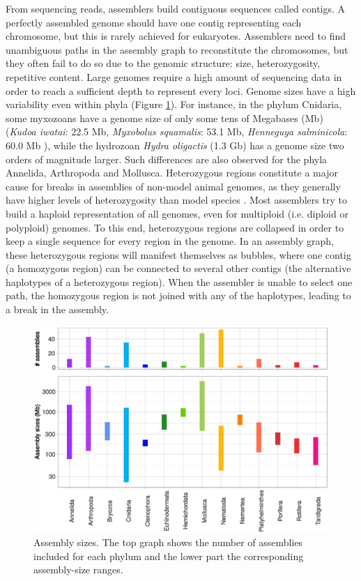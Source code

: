 From sequencing reads, assemblers build contiguous sequences called contigs. A perfectly assembled genome should have one contig representing each chromosome, but this is rarely achieved for eukaryotes. Assemblers need to find unambiguous paths in the assembly graph to reconstitute the chromosomes, but they often fail to do so due to the genomic structure: size, heterozygosity, repetitive content. Large genomes require a high amount of sequencing data in order to reach a sufficient depth to represent every loci. Genome sizes have a high variability even within phyla (Figure \ref{fig:sizes}). For instance, in the phylum Cnidaria, some myxozoans have a genome size of only some tens of Megabases (Mb) (\textit{Kudoa iwatai}: 22.5 Mb, \textit{Myxobolus squamalis}: 53.1 Mb, \textit{Henneguya salminicola}: 60.0 Mb \cite{henneguya_salminicola}), while the hydrozoan \textit{Hydra oligactis} (1.3 Gb) \cite{hydra_oligactis} has a genome size two orders of magnitude larger. Such differences are also observed for the phyla Annelida, Arthropoda and Mollusca. 
Heterozygous regions constitute a major cause for breaks in assemblies of non-model animal genomes, as they generally have higher levels of heterozygosity than model species \cite{Leffler2012a}. Most assemblers try to build a haploid representation of all genomes, even for multiploid (i.e. diploid or polyploid) genomes. To this end, heterozygous regions are collapsed in order to keep a single sequence for every region in the genome. In an assembly graph, these heterozygous regions will manifest themselves as bubbles, where one contig (a homozygous region) can be connected to several other contigs (the alternative haplotypes of a heterozygous region). When the assembler is unable to select one path, the homozygous region is not joined with any of the haplotypes, leading to a break in the assembly. 

\begin{figure}
    \centering
    \includegraphics[width=\textwidth]{fig/review_assembly_sizes.eps}
    \caption{Assembly sizes. The top graph shows the number of assemblies included for each phylum and the lower part the corresponding assembly-size ranges.}
    \label{fig:sizes}
\end{figure}

